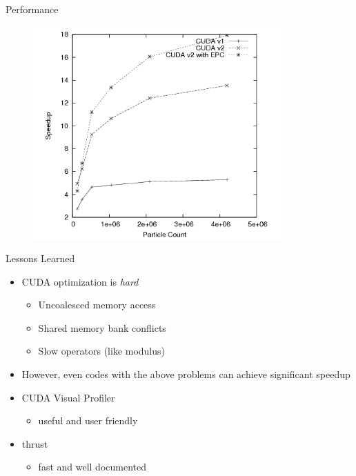 \documentclass{beamer}
\begin{document}

\begin{frame}{Performance}

\begin{figure}
\centering
\includegraphics[width=0.85\textwidth]{data/timing_results_speedup.png}
\label{final_timing2}
\end{figure}

\end{frame}


\begin{frame}{Lessons Learned}

\begin{itemize}
\item CUDA optimization is \emph{hard}
\begin{itemize}
\item Uncoalesced memory access
\item Shared memory bank conflicts
\item Slow operators (like modulus)
\end{itemize}
\item However, even codes with the above problems can achieve significant speedup
\item CUDA Visual Profiler
\begin{itemize}
\item useful and user friendly
\end{itemize}
\item thrust
\begin{itemize}
\item fast and well documented
\end{itemize}
\end{itemize}


\end{frame}
\end{document}

